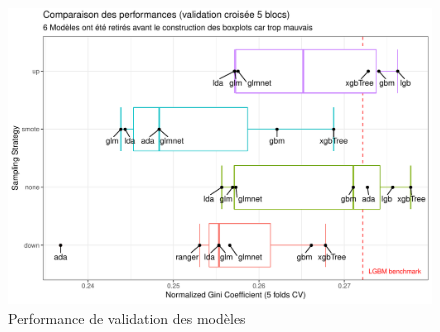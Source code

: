 \documentclass[french]{article}
\begin{document}
\begin{multicols}{2}
\begin{figure}[H] \centering
  \includegraphics[width = \columnwidth]{img/results}
  \caption{Performance de validation des modèles}
\end{figure}

\nocite{*}



\columnbreak

\

\end{multicols}
\end{document}
